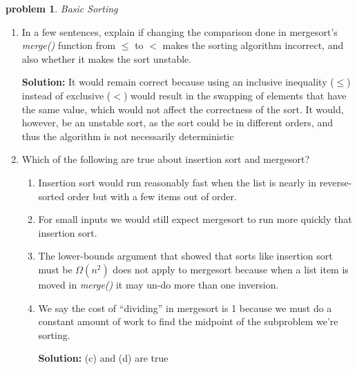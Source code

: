 \documentclass[10pt]{article}
\newtheorem{problem}{\sc\color{cit}problem}
\begin{document}
\begin{problem} Basic Sorting \end{problem}
    \begin{enumerate}   
    	\item In a few sentences, explain if changing the comparison done in mergesort's \emph{merge()} function from $\leq$ to $<$ makes the sorting algorithm incorrect, and also whether it makes the sort unstable.
    	
    	\textbf{Solution:}  It would remain correct because using an inclusive inequality ($\leq$) instead of exclusive ($<$) would result in the swapping of elements that have the same value, which would not affect the correctness of the sort. It would, however, be an unstable sort, as the sort could be in different orders, and thus the algorithm is not necessarily deterministic 
    	
    	\item Which of the following are true about insertion sort and mergesort?
    		\begin{enumerate} 
    		\item Insertion sort would run reasonably fast when the list is nearly in reverse-sorted order but with a few items out of order.
    		\item For small inputs we would still expect mergesort to run more quickly that insertion sort.
    		\item The lower-bounds argument that showed that sorts like insertion sort must be $\Omega(n^2)$ does not apply to mergesort because when a list item
    		is moved in \emph{merge()} it may un-do more than one inversion.    
    		\item We say the cost of ``dividing'' in mergesort is 1 because we must do a constant amount of work to find the midpoint of the subproblem we're sorting.
    		
    	\textbf{Solution:}  (c) and (d) are true
    	
		\end{enumerate} 
    	
    \end{enumerate}       	
\end{document}
